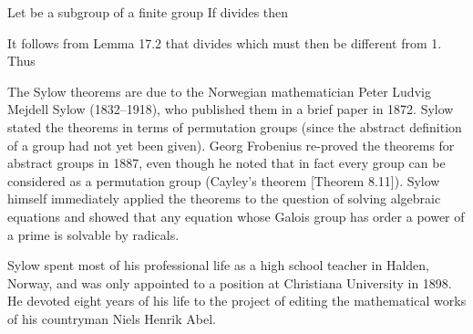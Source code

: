\documentclass[11pt,oneside]{article}
\begin{document}
\begin{BookBody}
 Let  be a subgroup of a finite group  If  divides  then 

 It follows from Lemma 17.2 that  divides  which must then be different from 1. Thus \BookEnd{\blacklozenge}


\noindent The Sylow theorems are due to the Norwegian mathematician Peter Ludvig Mejdell Sylow (1832–1918), who published them in a brief paper in 1872. Sylow stated the theorems in terms of permutation groups (since the abstract definition of a group had not yet been given). Georg Frobenius re-proved the theorems for abstract groups in 1887, even though he noted that in fact every group can be considered as a permutation group (Cayley’s theorem [Theorem 8.11]). Sylow himself immediately applied the theorems to the question of solving algebraic equations and showed that any equation whose Galois group has order a power of a prime  is solvable by radicals.

Sylow spent most of his professional life as a high school teacher in Halden, Norway, and was only appointed to a position at Christiana University in 1898. He devoted eight years of his life to the project of editing the mathematical works of his countryman Niels Henrik Abel.

\end{BookBody}

\BookNarrativetrue
\end{document}
